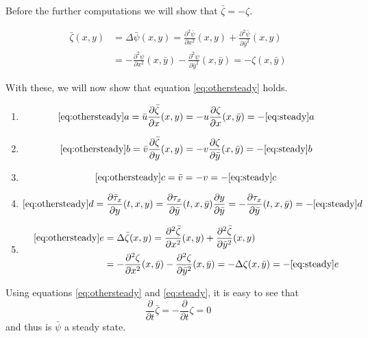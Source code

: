 Before the further computations we will show that $\bar{\zeta}=-\zeta$.

\begin{align*}
\bar{\zeta}(x,y) &= \Delta \bar{\psi}(x,y)
=\frac{\partial^2\bar{\psi}}{\partial x^2}(x, y)+\frac{\partial^2\bar{\psi}}{\partial \bar y^2}(x, y)  \\
&=-\frac{\partial^2\psi}{\partial x^2}(x,\bar y)-\frac{\partial^2\psi}{\partial \bar y^2}(x,\bar y)
=-\zeta(x,\bar y)
\end{align*}

With these, we will now show that equation \ref{eq:othersteady} holds.

\begin{enumerate}[label=\alph*]
\item 
\begin{equation*}
\ref{eq:othersteady} a=\bar u\frac{\partial\bar{\zeta}}{\partial x} (x,y) =-u \frac{\partial\zeta}{\partial x} (x,\bar y)=-\ref{eq:steady}a
\end{equation*}
\item
\begin{equation}
\ref{eq:othersteady}b=\bar{v}\frac{\partial\bar{\zeta}}{\partial y} (x,y) =-v \frac{\partial\zeta}{\partial \bar y} (x,\bar y)=-\ref{eq:steady}b
\end{equation}
\item
$$\ref{eq:othersteady}c=\bar{v}=-v=-\ref{eq:steady}c$$
\item
$$\ref{eq:othersteady}d=\frac{\partial \bar \tau_x}{\partial y}(t,x,y)=\frac{\partial \tau_x}{\partial \bar y}(t,x,\bar y)\frac{\partial y}{\partial \bar y}=-\frac{\partial \tau_x}{\partial \bar y}(t,x,\bar y)=-\ref{eq:steady}d$$
\item
\begin{align*}
\ref{eq:othersteady}e& =\Delta \bar{\zeta}(x,y)
=\frac{\partial^2\bar{\zeta}}{\partial x^2}(x, y)+\frac{\partial^2\bar{\zeta}}{\partial \bar y^2}(x, y) \\
&=-\frac{\partial^2\zeta}{\partial x^2}(x,\bar y)-\frac{\partial^2\zeta}{\partial \bar y^2}(x,\bar y)=-\Delta\zeta(x,\bar y)=-\ref{eq:steady} e
\end{align*}
\end{enumerate}

Using equations \ref{eq:othersteady} and \ref{eq:steady}, it is easy to see that
$$\frac{\partial}{\partial t}\bar{\zeta}=-\frac{\partial}{\partial t}\zeta=0$$ and thus is $\bar{\psi}$ a steady state.



